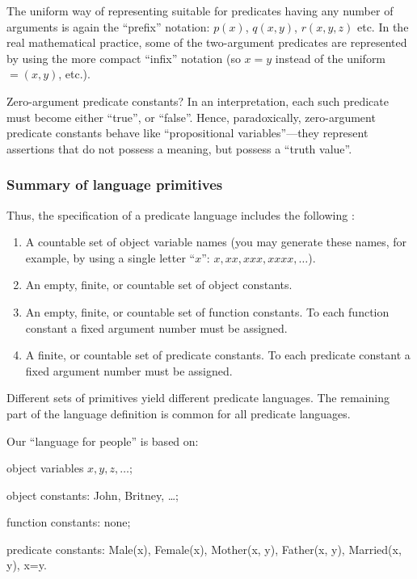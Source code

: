 The uniform way of representing suitable for predicates having any number of arguments is again the ``prefix'' notation: \(p(x)\), \(q(x, y)\), \(r(x, y, z)\) etc.
In the real mathematical practice, some of the two-argument predicates are represented by using the more compact ``infix'' notation (so \(x=y\) instead of the uniform \(=(x, y)\), etc.).

Zero-argument predicate constants?
In an interpretation, each such predicate must become either ``true'', or ``false''.
Hence, paradoxically, zero-argument predicate constants behave like ``propositional variables''---they represent assertions that do not possess a meaning, but possess a ``truth value''.

\subsubsection*{Summary of language primitives}

Thus, the specification of a predicate language includes the following :

\begin{enumerate}
    \item A countable set of object variable names (you may generate these names, for example, by using a single letter ``\(x\)'': \(x, xx, xxx, xxxx, \ldots\)).
    \item An empty, finite, or countable set of object constants.
    \item An empty, finite, or countable set of function constants.
    To each function constant a fixed argument number must be assigned.
    \item A finite, or countable set of predicate constants.
    To each predicate constant a fixed argument number must be assigned.
\end{enumerate}

Different sets of primitives yield different predicate languages. The remaining part of the language definition is common for all predicate languages.

\begin{example}
Our ``language for people'' is based on:
\begin{inparaenum}[(a)]
    \item object variables \(x, y, z, \ldots\);
    \item object constants: John, Britney, \ldots;
    \item function constants: none;
    \item predicate constants: Male(x), Female(x), Mother(x, y), Father(x, y), Married(x, y), x=y.
\end{inparaenum}
\end{example}


